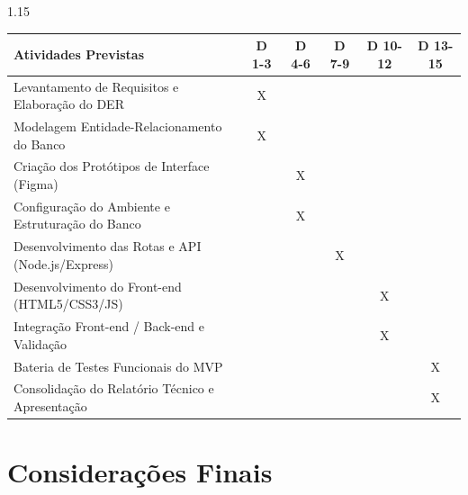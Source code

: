 \documentclass[12pt,a4paper]{article}
\begin{document}
\begin{table}[h!]

\centering

\begin{spacing}{1.15}

\begin{tabular}{|p{7.5cm}|c|c|c|c|c|}

\hline

\textbf{Atividades Previstas} & \textbf{D 1-3} & \textbf{D 4-6} & \textbf{D 7-9} & \textbf{D 10-12} & \textbf{D 13-15} \\ \hline

Levantamento de Requisitos e Elaboração do DER & X & & & & \\ \hline

Modelagem Entidade-Relacionamento do Banco & X & & & & \\ \hline

Criação dos Protótipos de Interface (Figma) & & X & & & \\ \hline

Configuração do Ambiente e Estruturação do Banco & & X & & & \\ \hline

Desenvolvimento das Rotas e API (Node.js/Express) & & & X & & \\ \hline

Desenvolvimento do Front-end (HTML5/CSS3/JS) & & & & X & \\ \hline

Integração Front-end / Back-end e Validação & & & & X & \\ \hline

Bateria de Testes Funcionais do MVP & & & & & X \\ \hline

Consolidação do Relatório Técnico e Apresentação & & & & & X \\ \hline

\end{tabular}

\end{spacing}

\end{table}

\newpage


\section{Considerações Finais}
\end{document}

